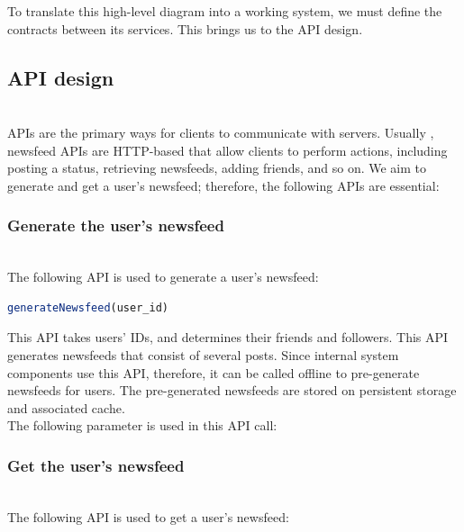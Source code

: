 To translate this high-level diagram into a working system, we must define the contracts between its services. This brings us to the API design.

\subsection{API design}\label{FXhjRWzLLhlLJ1SQU3pwH}
\\
APIs are the primary ways for clients to communicate with servers. Usually , newsfeed APIs are HTTP-based that allow clients to perform actions, including posting a status, retrieving newsfeeds, adding friends, and so on. We aim to generate and get a user's newsfeed; therefore, the following APIs are essential:

\subsubsection{Generate the user's newsfeed}\label{0L1YbHPovGkkO8Op1taAF}
\\
The following API is used to generate a user's newsfeed:

\begin{lstlisting}[language=JavaScript]
generateNewsfeed(user_id)
\end{lstlisting}

This API takes users' IDs, and determines their friends and followers. This API generates newsfeeds that consist of several posts. Since internal system components use this API, therefore, it can be called offline to pre-generate newsfeeds for users. The pre-generated newsfeeds are stored on persistent storage and associated cache.
\\
The following parameter is used in this API call:

\begin{table}[htbp]
\centering
\small
{}
\end{table}

\subsubsection{Get the user's newsfeed}\label{ZA6uFr5Z4Gt44AJ6ZT-9o}
\\
The following API is used to get a user's newsfeed:

